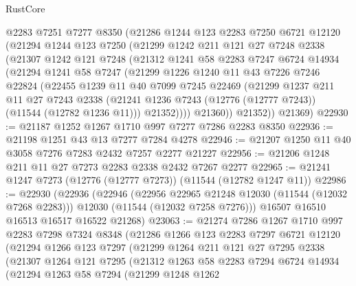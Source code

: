 \begin{lexlean}{RustCore}
\begin{coremodule}
    @2283
    @7251
    @7277
    @8350
    (@21286
      @1244
      @123
      @2283
      @7250
      @6721
      @12120
      (@21294
        @1244
        @123
        @7250
        (@21299
          @1242
          @211
          @121
          @27
          @7248
          @2338
          (@21307
            @1242
            @121
            @7248
            (@21312
              @1241
              @58
              @2283
              @7247
              @6724
              @14934
              (@21294
                @1241
                @58
                @7247
                (@21299
                  @1226
                  @1240
                  @11
                  @43
                  @7226
                  @7246
                  @22824
                  (@22455
                    @1239
                    @11
                    @40
                    @7099
                    @7245
                    @22469
                    (@21299
                      @1237
                      @211
                      @11
                      @27
                      @7243
                      @2338
                      (@21241 @1236 @7243 (@12776 (@12777 @7243)) (@11544 (@12782 @1236 @11)))
                      @21352))))
              @21360))
          @21352))
      @21369)
@22930 := @21187 @1252 @1267 @1710 @997 @7277 @7286 @2283 @8350
@22936 := @21198 @1251 @43 @13 @7277 @7284 @4278
@22946 := @21207 @1250 @11 @40 @3058 @7276 @7283 @2432 @7257 @2277 @21227
@22956 := @21206 @1248 @211 @11 @27 @7273 @2283 @2338 @2432 @7267 @2277
@22965 := @21241 @1247 @7273 (@12776 (@12777 @7273)) (@11544 (@12782 @1247 @11))
@22986 := @22930
    (@22936
      (@22946
        (@22956 @22965 @21248 @12030 (@11544 (@12032 @7268 @2283)))
        @12030
        (@11544 (@12032 @7258 @7276)))
      @16507
      @16510
      @16513
      @16517
      @16522
      @21268)
@23063 := @21274
    @7286
    @1267
    @1710
    @997
    @2283
    @7298
    @7324
    @8348
    (@21286
      @1266
      @123
      @2283
      @7297
      @6721
      @12120
      (@21294
        @1266
        @123
        @7297
        (@21299
          @1264
          @211
          @121
          @27
          @7295
          @2338
          (@21307
            @1264
            @121
            @7295
            (@21312
              @1263
              @58
              @2283
              @7294
              @6724
              @14934
              (@21294
                @1263
                @58
                @7294
                (@21299
                  @1248
                  @1262

\end{coremodule}
\end{lexlean}
